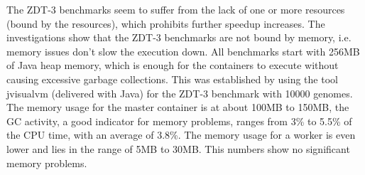 The ZDT-3 benchmarks seem to suffer from the lack of one or more resources (bound by the resources), which prohibits further speedup increases. The investigations show that the ZDT-3 benchmarks are not bound by memory, i.e. memory issues don't slow the execution down. All benchmarks start with 256MB of Java heap memory, which is enough for the containers to execute without causing excessive garbage collections. This was established by using the tool jvisualvm (delivered with Java) for the ZDT-3 benchmark with 10000 genomes. The memory usage for the master container is at about 100MB to 150MB, the GC activity, a good indicator for memory problems, ranges from 3\% to 5.5\% of the CPU time, with an average of 3.8\%. The memory usage for a worker is even lower and lies in the range of 5MB to 30MB. This numbers show no significant memory problems.


